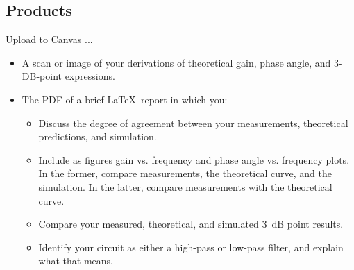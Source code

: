 \documentclass[11pt]{article}
\begin{document}
\subsection*{Products}

Upload to Canvas ...

\begin{itemize}
\item A scan or image of your derivations of theoretical gain,
  phase angle, and 3-DB-point expressions. 

\item The PDF of a brief \LaTeX\ report in which you:
  \begin{itemize}
    \item Discuss the degree of agreement between your
      measurements, theoretical predictions, and simulation.

    \item Include as figures gain vs. frequency and phase angle
      vs. frequency plots. In the former, compare measurements, the
      theoretical curve, and the simulation. In the latter, compare
      measurements with the theoretical curve.

    \item Compare your measured, theoretical, and simulated 3~dB
      point results.

    \item Identify your circuit as either a high-pass or low-pass
      filter, and explain what that means.
  \end{itemize}
\end{itemize}
\end{document}

